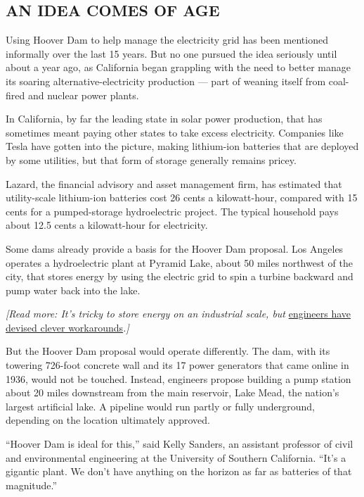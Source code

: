 \hypertarget{an-idea-comes-of-age}{%
\subsection{AN IDEA COMES OF AGE}\label{an-idea-comes-of-age}}

Using Hoover Dam to help manage the electricity grid has been mentioned
informally over the last 15 years. But no one pursued the idea seriously
until about a year ago, as California began grappling with the need to
better manage its soaring alternative-electricity production --- part of
weaning itself from coal-fired and nuclear power plants.

In California, by far the leading state in solar power production, that
has sometimes meant paying other states to take excess electricity.
Companies like Tesla have gotten into the picture, making lithium-ion
batteries that are deployed by some utilities, but that form of storage
generally remains pricey.

Lazard, the financial advisory and asset management firm, has estimated
that utility-scale lithium-ion batteries cost 26 cents a kilowatt-hour,
compared with 15 cents for a pumped-storage hydroelectric project. The
typical household pays about 12.5 cents a kilowatt-hour for electricity.

Some dams already provide a basis for the Hoover Dam proposal. Los
Angeles operates a hydroelectric plant at Pyramid Lake, about 50 miles
northwest of the city, that stores energy by using the electric grid to
spin a turbine backward and pump water back into the lake.

\emph{{[}Read more: It's tricky to store energy on an industrial scale,
but}
\href{https://www.nytimes3xbfgragh.onion/2017/06/03/business/energy-environment/biggest-batteries.html}{engineers
have devised clever workarounds}\emph{.{]}}

But the Hoover Dam proposal would operate differently. The dam, with its
towering 726-foot concrete wall and its 17 power generators that came
online in 1936, would not be touched. Instead, engineers propose
building a pump station about 20 miles downstream from the main
reservoir, Lake Mead, the nation's largest artificial lake. A pipeline
would run partly or fully underground, depending on the location
ultimately approved.

``Hoover Dam is ideal for this,'' said Kelly Sanders, an assistant
professor of civil and environmental engineering at the University of
Southern California. ``It's a gigantic plant. We don't have anything on
the horizon as far as batteries of that magnitude.''

